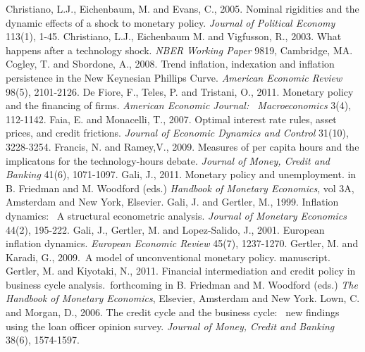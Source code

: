 \documentclass{article}
\begin{document}
Christiano, L.J., Eichenbaum, M. and Evans, C., 2005. Nominal rigidities and
the dynamic effects of a shock to monetary policy. \textit{Journal of
Political Economy }113(1), 1-45.\bigskip \newline
Christiano, L.J., Eichenbaum M. and Vigfusson, R., 2003. What happens after
a technology shock. \textit{NBER Working Paper }9819, Cambridge, MA.\bigskip
\newline
Cogley, T. and Sbordone, A., 2008. Trend inflation, indexation and inflation
persistence in the New Keynesian Phillips Curve. \textit{American Economic
Review} 98(5), 2101-2126.\bigskip \newline
De Fiore, F., Teles, P. and Tristani, O., 2011. Monetary policy and the
financing of firms. \textit{American Economic Journal: \ Macroeconomics }%
3(4), 112-1142.\bigskip \newline
Faia, E. and Monacelli, T., 2007. Optimal interest rate rules, asset prices,
and credit frictions. \textit{Journal of Economic Dynamics and Control }%
31(10), 3228-3254.\bigskip \newline
Francis, N. and Ramey,V., 2009. Measures of per capita hours and the
implicatons for the technology-hours debate. \textit{Journal of Money,
Credit and Banking} 41(6), 1071-1097.\bigskip \newline
Gali, J., 2011. Monetary policy and unemployment. in B. Friedman and M.
Woodford (eds.) \textit{Handbook of Monetary Economics}, vol 3A, Amsterdam
and New York, Elsevier.\bigskip \newline
Gali, J. and Gertler, M., 1999. Inflation dynamics: \ A structural
econometric analysis. \textit{Journal of Monetary Economics} 44(2),
195-222.\bigskip \newline
Gali, J., Gertler, M. and Lopez-Salido, J., 2001. European inflation
dynamics. \textit{European Economic Review} 45(7), 1237-1270.\bigskip
\newline
Gertler, M. and Karadi, G., 2009.\ A model of unconventional monetary
policy. manuscript.\bigskip \newline
Gertler, M. and Kiyotaki, N., 2011. Financial intermediation and credit
policy in business cycle analysis.\ forthcoming in B. Friedman and M.
Woodford (eds.) \textit{The Handbook of Monetary Economics}, Elsevier,
Amsterdam and New York.\bigskip \newline
Lown, C. and Morgan, D., 2006. The credit cycle and the business cycle: \
new findings using the loan officer opinion survey. \textit{Journal of
Money, Credit and Banking} 38(6), 1574-1597.\bigskip \newline
\end{document}
